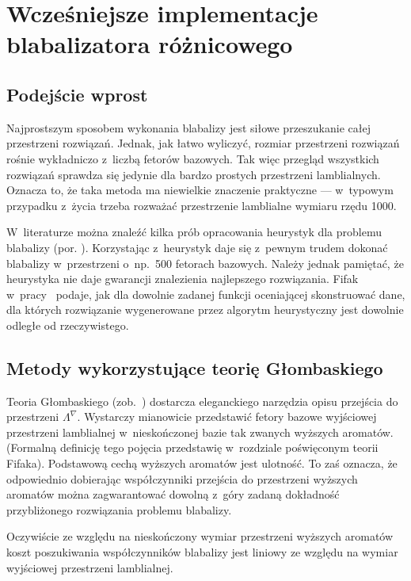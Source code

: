 \documentclass[licencjacka]{pracamgr}
\begin{document}
\chapter{Wcześniejsze implementacje blabalizatora
  różnicowego}\label{r:losers}

\section{Podejście wprost}

Najprostszym sposobem wykonania blabalizy jest siłowe przeszukanie
całej przestrzeni rozwiązań.  Jednak, jak łatwo wyliczyć, rozmiar
przestrzeni rozwiązań rośnie wykładniczo z~liczbą fetorów bazowych.
Tak więc przegląd wszystkich rozwiązań sprawdza się jedynie dla bardzo
prostych przestrzeni lamblialnych.  Oznacza to, że taka metoda ma
niewielkie znaczenie praktyczne --- w~typowym przypadku z~życia trzeba
rozważać przestrzenie lamblialne wymiaru rzędu 1000.

W~literaturze można znaleźć kilka prób opracowania heurystyk dla
problemu blabalizy (por. \cite{heu}).  Korzystając z~heurystyk daje
się z~pewnym trudem dokonać blabalizy w~przestrzeni o~np.~500 fetorach
bazowych.  Należy jednak pamiętać, że heurystyka nie daje gwarancji
znalezienia najlepszego rozwiązania.  Fifak w~pracy~\cite{ff-sr}
podaje, jak dla dowolnie zadanej funkcji oceniającej skonstruować
dane, dla których rozwiązanie wygenerowane przez algorytm heurystyczny
jest dowolnie odległe od rzeczywistego.

\section{Metody wykorzystujące teorię Głombaskiego}

Teoria Głombaskiego (zob.~\cite{grglo}) dostarcza eleganckiego
narzędzia opisu przejścia do przestrzeni $\Lambda^{\nabla}$.
Wystarczy mianowicie przedstawić fetory bazowe wyjściowej przestrzeni
lamblialnej w~nieskończonej bazie tak zwanych wyższych aromatów.
(Formalną definicję tego pojęcia przedstawię w~rozdziale poświęconym
teorii Fifaka).  Podstawową cechą wyższych aromatów jest ulotność.  To
zaś oznacza, że odpowiednio dobierając współczynniki przejścia do
przestrzeni wyższych aromatów można zagwarantować dowolną z~góry
zadaną dokładność przybliżonego rozwiązania problemu blabalizy.

Oczywiście ze względu na nieskończony wymiar przestrzeni wyższych
aromatów koszt poszukiwania współczynników blabalizy jest liniowy ze
względu na wymiar wyjściowej przestrzeni lamblialnej.
\end{document}
